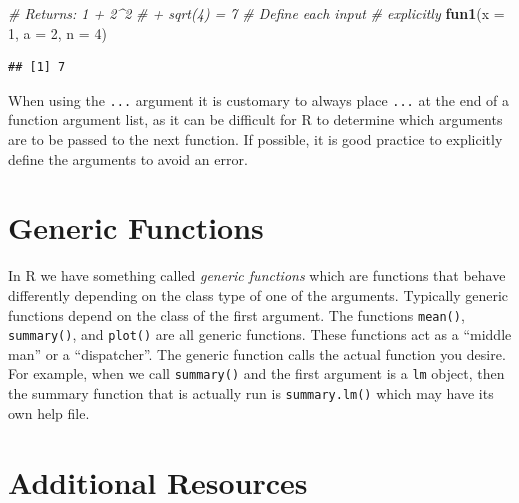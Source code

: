 \documentclass[
]{book}
\newenvironment{Shaded}{\begin{snugshade}}{\end{snugshade}}
\newcommand{\CommentTok}[1]{\textcolor[rgb]{0.56,0.35,0.01}{\textit{#1}}}
\newcommand{\DataTypeTok}[1]{\textcolor[rgb]{0.13,0.29,0.53}{#1}}
\newcommand{\DecValTok}[1]{\textcolor[rgb]{0.00,0.00,0.81}{#1}}
\newcommand{\KeywordTok}[1]{\textcolor[rgb]{0.13,0.29,0.53}{\textbf{#1}}}
\newcommand{\NormalTok}[1]{#1}
\begin{document}
\begin{Shaded}
\begin{Highlighting}[]
\CommentTok{# Returns: 1 + 2^2}
\CommentTok{# + sqrt(4) = 7}
\CommentTok{# Define each input}
\CommentTok{# explicitly}
\KeywordTok{fun1}\NormalTok{(}\DataTypeTok{x =} \DecValTok{1}\NormalTok{, }\DataTypeTok{a =} \DecValTok{2}\NormalTok{, }\DataTypeTok{n =} \DecValTok{4}\NormalTok{)}
\end{Highlighting}
\end{Shaded}

\begin{verbatim}
## [1] 7
\end{verbatim}

When using the \texttt{...} argument it is customary to always place \texttt{...} at the end of a function argument list, as it can be difficult for R to determine which arguments are to be passed to the next function. If possible, it is good practice to explicitly define the arguments to avoid an error.

\hypertarget{generic-functions}{%
\section{Generic Functions}\label{generic-functions}}

In R we have something called \emph{generic functions} which are functions that behave differently depending on the class type of one of the arguments. Typically generic functions depend on the class of the first argument. The functions \texttt{mean()}, \texttt{summary()}, and \texttt{plot()} are all generic functions. These functions act as a ``middle man'' or a ``dispatcher''. The generic function calls the actual function you desire. For example, when we call \texttt{summary()} and the first argument is a \texttt{lm} object, then the summary function that is actually run is \texttt{summary.lm()} which may have its own help file.

\hypertarget{additional-resources-3}{%
\section*{Additional Resources}\label{additional-resources-3}}
\end{document}
